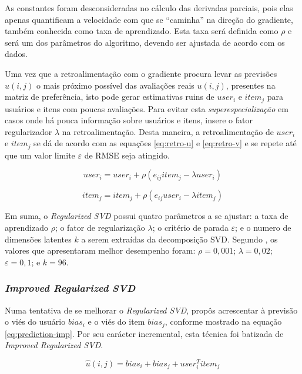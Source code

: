 As constantes foram desconsideradas no cálculo das derivadas parciais, pois elas apenas quantificam a velocidade com que se ``caminha'' na direção do gradiente, também conhecida como taxa de aprendizado. Esta taxa será definida como $\rho$ e será um dos parâmetros do algoritmo, devendo ser ajustada de acordo com os dados.

Uma vez que a retroalimentação com o gradiente procura levar as previsões $\hat{u}(i,j)$ o mais próximo possível das avaliações reais $u(i,j)$, presentes na matriz de preferência, isto pode gerar estimativas ruins de $user_i$ e $item_j$ para usuários e itens com poucas avaliações. Para evitar esta \textit{superespecialização} em casos onde há pouca informação sobre usuários e itens, \citep{Funk:2006:Online} insere o fator regularizador $\lambda$ na retroalimentação. Desta maneira, a retroalimentação de $user_i$ e $item_j$ se dá de acordo com as equações \ref{eq:retro-u} e \ref{eq:retro-v} e se repete até que um valor limite $\varepsilon$ de RMSE seja atingido.

\begin{equation}
user_i = user_i + \rho (e_{ij} item_j - \lambda user_i)
\label{eq:retro-u}
\end{equation}

\begin{equation}
item_j = item_j + \rho (e_{ij} user_i - \lambda item_j)
\label{eq:retro-v}
\end{equation}

Em suma, o \textit{Regularized SVD} possui quatro parâmetros a se ajustar: a taxa de aprendizado $\rho$; o fator de regularização $\lambda$; o critério de parada $\varepsilon$; e o numero de dimensões latentes $k$ a serem extraídas da decomposição SVD. Segundo \citep{paterek_2007}, os valores que apresentaram melhor desempenho foram: $\rho=0,001$; $\lambda=0,02$; $\varepsilon=0,1$; e $k=96$.

\subsubsection{\textit{Improved Regularized SVD}}
\label{sec:improved-regularized-svd}
Numa tentativa de se melhorar o \textit{Regularized SVD}, \citep{paterek_2007} propôs acrescentar à previsão o viés do usuário $bias_i$ e o viés do item $bias_j$, conforme mostrado na equação \ref{eq:prediction-imp}. Por seu carácter incremental, esta técnica foi batizada de \textit{Improved Regularized SVD}. 

\begin{equation}
\hat{u}(i,j) = bias_i + bias_j + user_{i}^{T}item_{j}
\label{eq:prediction-imp}
\end{equation}

